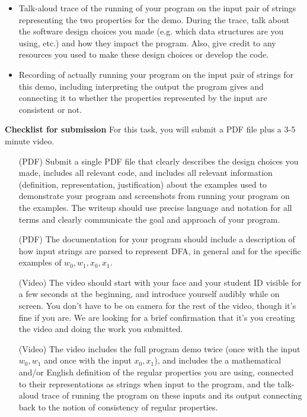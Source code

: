 \documentclass[12pt, oneside]{article}
\begin{document}
\begin{enumerate}
\begin{itemize}
\item Talk-aloud trace of the running of your program on the input pair of strings representing the two properties for the demo. During the trace, talk about the software design choices you made
(e.g. which data structures are you using, etc.) and how they impact the program. Also, give credit to any resources you used to make these design choices or develop the code. 
\item Recording of actually running your program on the input pair of strings for this demo, including interpreting the output the program gives and connecting it to whether the properties represented by the input are consistent or not.
\end{itemize}
\end{enumerate}

\newpage 

{\bf Checklist for submission} For this task, you will submit a PDF file plus a 3-5 minute video.


\begin{itemize}
   \item[(PDF)] Submit a single PDF file that clearly describes the design choices you made, includes
   all relevant code, and includes all relevant information (definition, representation, justification) about the examples used to demonstrate your program and screenshots from running your program on the examples. The writeup should use precise language and notation for all terms and clearly communicate the goal and approach of your program.
   \item[(PDF)] The documentation for your program should include a description of how input strings are parsed to represent DFA, in general and for the specific examples of $w_0, w_1, x_0, x_1$.
   \item[(Video)] The video should start with your face and your student ID visible for a few seconds at the beginning, and introduce yourself audibly while on screen. You don't have to be on camera for the  rest of the video, though it's fine if you are. We are looking for a brief confirmation that  it's you creating the video and doing the work you submitted.
\item[(Video)] The video includes the full program demo twice (once with the input $w_0,w_1$ and once with the input $x_0,x_1$), and includes the 
a mathematical and/or English definition of the regular properties you are using, connected to their
representations as strings when input to the program, and the talk-aloud trace of running the program on these inputs and its output connecting back to the notion of consistency of regular properties.
\end{itemize}
\end{document}
